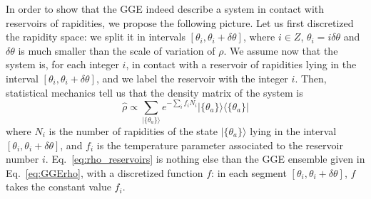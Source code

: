 \documentclass[onecolumn,amsfonts,showpacs,superscriptaddress]{revtex4-1}
\begin{document}
In order to show that the GGE indeed describe a system in contact with reservoirs of rapidities, we propose the following picture. 
Let us first discretized the rapidity space: we split it in intervals $[\theta_i,\theta_i+\delta \theta]$,
where $i\in Z$, $\theta_i=i\delta \theta$ and $\delta \theta$ is much smaller than the scale of variation of $\rho$.
We assume now that the system is, for each integer $i$, in contact with a reservoir of rapidities lying in the interval $[\theta_i,\theta_i+\delta \theta]$, and we label the reservoir with  the integer $i$. 
Then, statistical mechanics tell us that the density matrix of the system is 
\begin{equation}
    \hat{\rho}\propto
    \sum_{|\{\theta_a\}\rangle}
     e^{-\sum_i f_i N_i} |\{\theta_a\}\rangle \langle \{\theta_a\}|
     \label{eq:rho_reservoirs}
\end{equation}
where $N_i$ is the number of rapidities
of the state $|\{\theta_a\}\rangle$ lying in the interval 
$[\theta_i,\theta_i+\delta \theta]$, and $f_i$ is the temperature parameter associated to the reservoir
number $i$. Eq.~\ref{eq:rho_reservoirs} is nothing else than the GGE ensemble given in Eq.~\ref{eq:GGErho}, with a discretized function $f$: in each segment $[\theta_i,\theta_i+\delta \theta]$,
 $f$ takes the constant value $f_i$.




\end{document}
